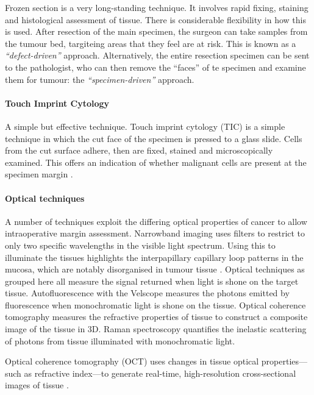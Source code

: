 Frozen section is a very long-standing technique.
It involves rapid fixing, staining and histological assessment of tissue.
There is considerable flexibility in how this is used.
After resection of the main specimen, the surgeon can take samples from the tumour bed, targiteing areas that they feel are at risk.
This is known as a \emph{``defect-driven''} approach.
Alternatively, the entire resection specimen can be sent to the pathologist, who can then remove the ``faces'' of te specimen and examine them for tumour: the \emph{``specimen-driven''} approach.

\paragraph{Touch Imprint Cytology}
A simple but effective technique. 
Touch imprint cytology (TIC) is a simple technique in which the cut face of the specimen is pressed to a glass slide. 
Cells from the cut surface adhere, then are fixed, stained and microscopically examined. 
This offers an indication of whether malignant cells are present at the specimen margin \cite{naveedDiagnosticAccuracyTouch2017}.


\paragraph{Optical techniques}
A number of techniques exploit the differing optical properties of cancer to allow intraoperative margin assessment.
Narrowband imaging uses filters to restrict to only two specific wavelengths in the visible light spectrum.
Using this to illuminate the tissues highlights the interpapillary capillary loop patterns in the mucosa, which are notably disorganised in tumour tissue \cite{vuEfficacyNarrowBand2014}.
Optical techniques as grouped here all measure the signal returned when light is shone on the target tissue.
Autofluorescence with the Velscope measures the photons emitted by fluorescence when monochromatic light is shone on the tissue.
Optical coherence tomography measures the refractive properties of tissue to construct a composite image of the tissue in 3D.
Raman spectroscopy quantifies the inelastic scattering of photons from tissue illuminated with monochromatic light.

Optical coherence tomography (OCT) uses changes in tissue optical properties---such as refractive index---to generate real-time, high-resolution cross-sectional images of tissue \cite{heidaria.e.UseOpticalCoherence2020}.

